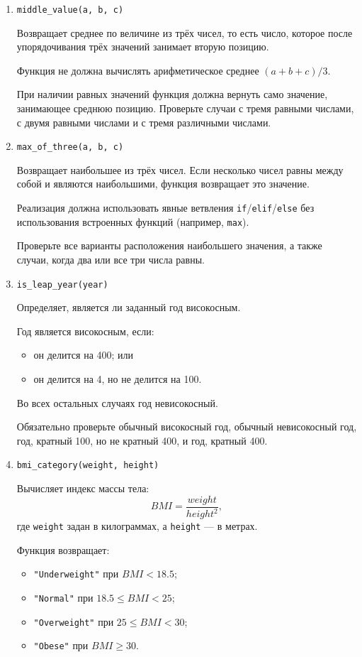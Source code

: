\begin{enumerate}
Отдельно проверьте положительные и отрицательные числа каждой чётности,
а также ноль.

\item \texttt{middle\_value(a, b, c)}

Возвращает среднее по величине из трёх чисел, то есть число, которое
после упорядочивания трёх значений занимает вторую позицию.

Функция не должна вычислять арифметическое среднее
$(a+b+c)/3$.

При наличии равных значений функция должна вернуть само значение,
занимающее среднюю позицию. Проверьте случаи с тремя равными числами,
с двумя равными числами и с тремя различными числами.

\item \texttt{max\_of\_three(a, b, c)}

Возвращает наибольшее из трёх чисел. Если несколько чисел равны между
собой и являются наибольшими, функция возвращает это значение.

Реализация должна использовать явные ветвления
\texttt{if}/\texttt{elif}/\texttt{else} без использования встроенных
функций (например, \texttt{max}).

Проверьте все варианты расположения наибольшего значения, а также случаи,
когда два или все три числа равны.

\item \texttt{is\_leap\_year(year)}

Определяет, является ли заданный год високосным.

Год является високосным, если:
\begin{itemize}
    \item он делится на 400; или
    \item он делится на 4, но не делится на 100.
\end{itemize}

Во всех остальных случаях год невисокосный.

Обязательно проверьте обычный високосный год, обычный невисокосный год,
год, кратный 100, но не кратный 400, и год, кратный 400.

\item \texttt{bmi\_category(weight, height)}

Вычисляет индекс массы тела:
\[
BMI = \frac{weight}{height^2},
\]
где \texttt{weight} задан в килограммах, а \texttt{height} --- в метрах.

Функция возвращает:
\begin{itemize}
    \item \texttt{"Underweight"} при $BMI < 18.5$;
    \item \texttt{"Normal"} при $18.5 \leq BMI < 25$;
    \item \texttt{"Overweight"} при $25 \leq BMI < 30$;
    \item \texttt{"Obese"} при $BMI \geq 30$.
\end{itemize}


\end{enumerate}
